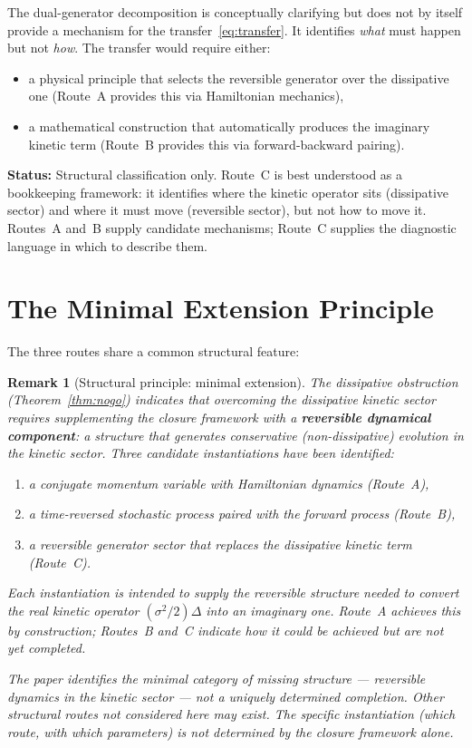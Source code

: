 \documentclass[12pt]{article}
\newtheorem{remark}[theorem]{Remark}
\begin{document}
The dual-generator decomposition is conceptually clarifying but does not by itself provide a mechanism for the transfer~\eqref{eq:transfer}. It identifies \textit{what} must happen but not \textit{how}. The transfer would require either:
\begin{itemize}
    \item a physical principle that selects the reversible generator over the dissipative one (Route~A provides this via Hamiltonian mechanics),
    \item a mathematical construction that automatically produces the imaginary kinetic term (Route~B provides this via forward-backward pairing).
\end{itemize}

\textbf{Status:} Structural classification only. Route~C is best understood as a bookkeeping framework: it identifies where the kinetic operator sits (dissipative sector) and where it must move (reversible sector), but not how to move it. Routes~A and~B supply candidate mechanisms; Route~C supplies the diagnostic language in which to describe them.

\section{The Minimal Extension Principle}\label{sec:minimal}

The three routes share a common structural feature:

\begin{remark}[Structural principle: minimal extension]\label{rem:minimal}
The dissipative obstruction (Theorem~\ref{thm:nogo}) indicates that overcoming the dissipative kinetic sector requires supplementing the closure framework with a \textbf{reversible dynamical component}: a structure that generates conservative (non-dissipative) evolution in the kinetic sector. Three candidate instantiations have been identified:
\begin{enumerate}
    \item a conjugate momentum variable with Hamiltonian dynamics (Route~A),
    \item a time-reversed stochastic process paired with the forward process (Route~B),
    \item a reversible generator sector that replaces the dissipative kinetic term (Route~C).
\end{enumerate}
Each instantiation is intended to supply the reversible structure needed to convert the real kinetic operator $(\sigma^2/2)\Delta$ into an imaginary one. Route~A achieves this by construction; Routes~B and~C indicate how it could be achieved but are not yet completed.

The paper identifies the minimal \textit{category} of missing structure --- reversible dynamics in the kinetic sector --- not a uniquely determined completion. Other structural routes not considered here may exist. The specific instantiation (which route, with which parameters) is not determined by the closure framework alone.
\end{remark}
\end{document}
